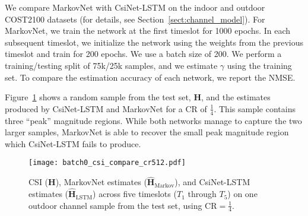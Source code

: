 We compare MarkovNet with CsiNet-LSTM \cite{ref:Wang2019CsiNetLSTM} on the indoor and outdoor COST2100 datasets (for details, see Section~\ref{sect:channel_model}). For MarkovNet, we train the network at the first timeslot for 1000 epochs. In each subsequent timeslot, we initialize the network using the weights from the previous timeslot and train for 200 epochs. We use a batch size of 200. We perform a training/testing split of 75k/25k samples, and we estimate $\gamma$ using the training set. To compare the estimation accuracy of each network, we report the NMSE.

Figure~\ref{fig:csi_image} shows a random sample from the test set, $\mathbf H$, and the estimates produced by CsiNet-LSTM and MarkovNet for a CR of $\frac 14$. This sample contains three ``peak'' magnitude regions. While both networks manage to capture the two larger samples, MarkovNet is able to recover the small peak magnitude region which CsiNet-LSTM fails to produce.

\begin{figure}[htb] \centering 
	\texttt{[image: batch0\_csi\_compare\_cr512.pdf]}
	\caption{CSI ($\mathbf H$), MarkovNet estimates ($\hat{\mathbf H}_{\text{Markov}}$), and CsiNet-LSTM estimates ($\hat{\mathbf H}_{\text{LSTM}}$) across five timeslots ($T_1$ through $T_5$) on one outdoor channel sample from the test set,
using $\text{CR}=\frac 14$.} 
	\label{fig:csi_image} 
\end{figure}